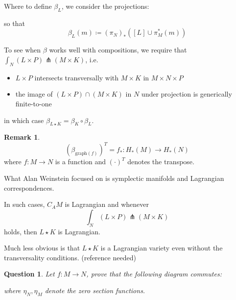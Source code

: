 \documentclass[12pt]{amsart}
\numberwithin{equation}{section}
\newtheorem{Question}{Question}
\theoremstyle{definition}
\newtheorem{Remark}[equation]{Remark}
\numberwithin{figure}{section}
\begin{document}
Where to define $\beta_L$, we consider the projections:
\begin{center}
\end{center}
so that
\[
	\beta_L(m) \coloneqq (\pi_N)_*([L] \cup \pi_M^*(m))
\]

To see when $\beta$ works well with compositions, we require that $\int_N (L\times P) \pitchfork (M\times K)$, i.e.
\begin{itemize}
	\item $L\times P$ intersects transversally with $M\times K$ in $M\times N\times P$
	\item the image of $(L\times P) \cap (M\times K)$ in $N$ under projection is generically finite-to-one
\end{itemize}
in which case $\beta_{L \star K} = \beta_{K} \circ \beta_{L}$.


\begin{Remark}
	\[
		(\beta_{\text{graph}(f)})^T = f_* : H_*(M) \to H_*(N)
	\]
	where $f:M \to N$ is a function and $(\cdot)^T$ denotes the transpose.
\end{Remark}

What Alan Weinstein focused on is {\color{red} symplectic} manifolds and {\color{red} Lagrangian} correspondences.

In such cases, $C_A M$ is Lagrangian and whenever \[
	\int_N (L\times P) \pitchfork (M\times K)
\] holds, then $L \star K$ is Lagrangian.

Much less obvious is that $L \star K$ is a Lagrangian variety even without the transversality conditions. (reference needed)

\begin{Question}
	Let $f : M \to N$, prove that the following diagram commutes:

	\begin{center}
	\end{center}
	where $\eta_N,\eta_M$ denote the zero section functions.
\end{Question}
\end{document}
